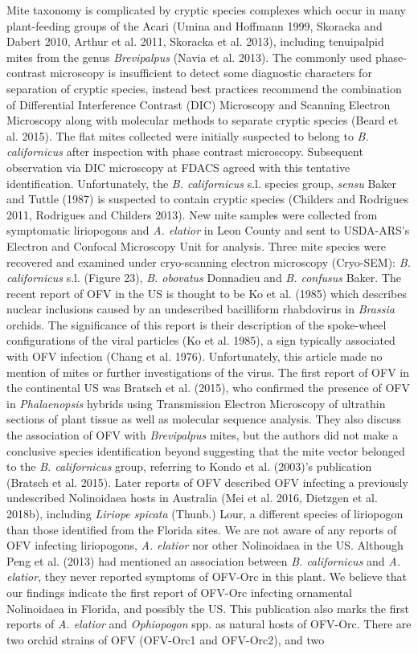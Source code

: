 \documentclass[12pt,final,CPage]{ufthesis}
\begin{document}
{  Mite taxonomy is complicated by cryptic species complexes which occur in many plant-feeding groups of the Acari (Umina and Hoffmann 1999, Skoracka and Dabert 2010, Arthur et al. 2011, Skoracka et al. 2013), including tenuipalpid mites from the genus \emph{Brevipalpus} (Navia et al. 2013). The commonly used phase-contrast microscopy is insufficient to detect some diagnostic characters for separation of cryptic species, instead best practices recommend the combination of Differential Interference Contrast (DIC) Microscopy and Scanning Electron Microscopy along with molecular methods to separate cryptic species (Beard et al. 2015). The flat mites collected were initially suspected to belong to \emph{B. californicus} after inspection with phase contrast microscopy. Subsequent observation via DIC microscopy at FDACS agreed with this tentative identification. Unfortunately, the \emph{B. californicus} s.l. species group, \emph{sensu} Baker and Tuttle (1987) is suspected to contain cryptic species (Childers and Rodrigues 2011, Rodrigues and Childers 2013). New mite samples were collected from symptomatic liriopogons and \emph{A. elatior} in Leon County and sent to USDA-ARS's Electron and Confocal Microscopy Unit for analysis. Three mite species were recovered and examined under cryo-scanning electron microscopy (Cryo-SEM): \emph{B. californicus} s.l. (Figure 23), \emph{B. obovatus} Donnadieu and \emph{B. confusus} Baker. The recent report of OFV in the US is thought to be Ko et al. (1985) which describes nuclear inclusions caused by an undescribed bacilliform rhabdovirus in \emph{Brassia} orchids. The significance of this report is their description of the spoke-wheel configurations of the viral particles (Ko et al. 1985), a sign typically associated with OFV infection (Chang et al. 1976). Unfortunately, this article made no mention of mites or further investigations of the virus. The first report of OFV in the continental US was Bratsch et al. (2015), who confirmed the presence of OFV in \emph{Phalaenopsis} hybrids using Transmission Electron Microscopy of ultrathin sections of plant tissue as well as molecular sequence analysis. They also discuss the association of OFV with \emph{Brevipalpus} mites, but the authors did not make a conclusive species identification beyond suggesting that the mite vector belonged to the \emph{B. californicus} group, referring to Kondo et al. (2003)'s publication (Bratsch et al. 2015). Later reports of OFV described OFV infecting a previously undescribed Nolinoidaea hosts in Australia (Mei et al. 2016, Dietzgen et al. 2018b), including \emph{Liriope spicata} (Thunb.) Lour, a different species of liriopogon than those identified from the Florida sites. We are not aware of any reports of OFV infecting liriopogons, \emph{A. elatior} nor other Nolinoidaea in the US. Although Peng et al. (2013) had mentioned an association between \emph{B. californicus} and \emph{A. elatior}, they never reported symptoms of OFV-Orc in this plant. We believe that our findings indicate the first report of OFV-Orc infecting ornamental Nolinoidaea in Florida, and possibly the US. This publication also marks the first reports of \emph{A. elatior} and \emph{Ophiopogon} spp. as natural hosts of OFV-Orc. There are two orchid strains of OFV (OFV-Orc1 and OFV-Orc2), and two }
\end{document}
